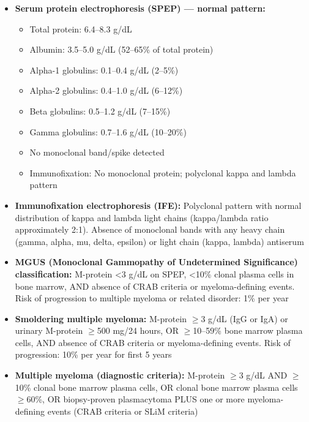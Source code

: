 \begin{itemize}
  \item \textbf{Serum protein electrophoresis (SPEP) --- normal pattern:}
  \begin{itemize}
    \item Total protein: 6.4--8.3 g/dL
    \item Albumin: 3.5--5.0 g/dL (52--65\% of total protein)
    \item Alpha-1 globulins: 0.1--0.4 g/dL (2--5\%)
    \item Alpha-2 globulins: 0.4--1.0 g/dL (6--12\%)
    \item Beta globulins: 0.5--1.2 g/dL (7--15\%)
    \item Gamma globulins: 0.7--1.6 g/dL (10--20\%)
    \item No monoclonal band/spike detected
    \item Immunofixation: No monoclonal protein; polyclonal kappa and lambda pattern
  \end{itemize}
  \item \textbf{Immunofixation electrophoresis (IFE):} Polyclonal pattern with normal distribution of kappa and lambda light chains (kappa/lambda ratio approximately 2:1). Absence of monoclonal bands with any heavy chain (gamma, alpha, mu, delta, epsilon) or light chain (kappa, lambda) antiserum
  \item \textbf{MGUS (Monoclonal Gammopathy of Undetermined Significance) classification:} M-protein <3 g/dL on SPEP, <10\% clonal plasma cells in bone marrow, AND absence of CRAB criteria or myeloma-defining events. Risk of progression to multiple myeloma or related disorder: 1\% per year
  \item \textbf{Smoldering multiple myeloma:} M-protein $\geq$3 g/dL (IgG or IgA) or urinary M-protein $\geq$500 mg/24 hours, OR $\geq$10--59\% bone marrow plasma cells, AND absence of CRAB criteria or myeloma-defining events. Risk of progression: 10\% per year for first 5 years
  \item \textbf{Multiple myeloma (diagnostic criteria):} M-protein $\geq$3 g/dL AND $\geq$10\% clonal bone marrow plasma cells, OR clonal bone marrow plasma cells $\geq$60\%, OR biopsy-proven plasmacytoma PLUS one or more myeloma-defining events (CRAB criteria or SLiM criteria)
\end{itemize}

